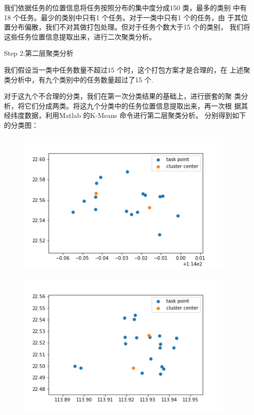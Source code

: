 我们依据任务的位置信息将任务按照分布的集中度分成150 类，最多的类别
中有18 个任务。最少的类别中只有1 个任务。对于一类中只有1 个的任务，由
于其位置分布偏散，我们不对其做打包处理。但对于任务个数大于15 个的类别，
我们将这些任务位置信息提取出来，进行二次聚类分析。

Step 2:第二层聚类分析

我们假设当一类中任务数量不超过15 个时，这个打包方案才是合理的，在
上述聚类分析中，有九个类别中的任务数量超过了15 个.

对于这九个不合理的分类，我们在第一次分类结果的基础上，进行嵌套的聚
类分析，将它们分成两类。将这九个分类中的任务位置信息提取出来，再一次根
据其经纬度数据，利用Matlab 的K-Means 命令进行第二层聚类分析。
分别得到如下的分类图：

\begin{figure}
    \centering
    \begin{minipage}[c]{0.3\textwidth}
        \centering
        \includegraphics[width=0.95\textwidth]{24.png}
        \label{fig:sample-figure-a}
    \end{minipage}
    \begin{minipage}[c]{0.3\textwidth}
        \centering
        \includegraphics[width=0.95\textwidth]{25.png}

\end{minipage}
\end{figure}
